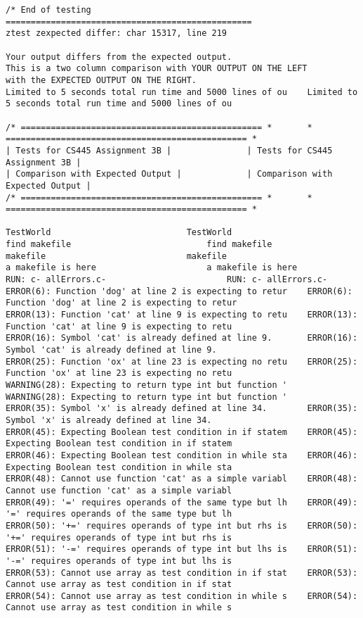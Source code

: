 \documentclass[12pt]{book}
\begin{document}
\begin{lstlisting}
/* End of testing
=================================================
ztest zexpected differ: char 15317, line 219

Your output differs from the expected output.
This is a two column comparison with YOUR OUTPUT ON THE LEFT
with the EXPECTED OUTPUT ON THE RIGHT.
Limited to 5 seconds total run time and 5000 lines of ou	Limited to 5 seconds total run time and 5000 lines of ou

/* ================================================ *		* ================================================ *
| Tests for CS445 Assignment 3B |				| Tests for CS445 Assignment 3B |
| Comparison with Expected Output |				| Comparison with Expected Output |
/* ================================================ *		* ================================================ *

TestWorld							TestWorld
find makefile							find makefile
makefile							makefile
a makefile is here						a makefile is here
RUN: c- allErrors.c-						RUN: c- allErrors.c-
ERROR(6): Function 'dog' at line 2 is expecting to retur	ERROR(6): Function 'dog' at line 2 is expecting to retur
ERROR(13): Function 'cat' at line 9 is expecting to retu	ERROR(13): Function 'cat' at line 9 is expecting to retu
ERROR(16): Symbol 'cat' is already defined at line 9.		ERROR(16): Symbol 'cat' is already defined at line 9.
ERROR(25): Function 'ox' at line 23 is expecting no retu	ERROR(25): Function 'ox' at line 23 is expecting no retu
WARNING(28): Expecting to return type int but function '	WARNING(28): Expecting to return type int but function '
ERROR(35): Symbol 'x' is already defined at line 34.		ERROR(35): Symbol 'x' is already defined at line 34.
ERROR(45): Expecting Boolean test condition in if statem	ERROR(45): Expecting Boolean test condition in if statem
ERROR(46): Expecting Boolean test condition in while sta	ERROR(46): Expecting Boolean test condition in while sta
ERROR(48): Cannot use function 'cat' as a simple variabl	ERROR(48): Cannot use function 'cat' as a simple variabl
ERROR(49): '=' requires operands of the same type but lh	ERROR(49): '=' requires operands of the same type but lh
ERROR(50): '+=' requires operands of type int but rhs is	ERROR(50): '+=' requires operands of type int but rhs is
ERROR(51): '-=' requires operands of type int but lhs is	ERROR(51): '-=' requires operands of type int but lhs is
ERROR(53): Cannot use array as test condition in if stat	ERROR(53): Cannot use array as test condition in if stat
ERROR(54): Cannot use array as test condition in while s	ERROR(54): Cannot use array as test condition in while s

\end{lstlisting}
\end{document}
